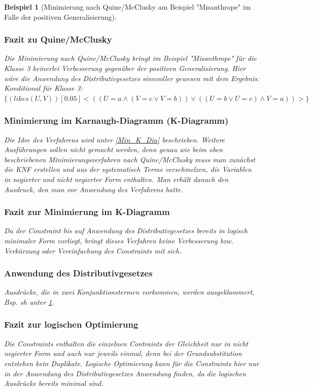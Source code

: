 \documentclass[a4paper, 11pt]{book}
\newtheorem{Bsp}{Beispiel}[section]
\begin{document}
{\begin{Bsp}[Minimierung nach Quine/McClusky am Beispiel "{}Misanthrope"{} im Falle der positiven Generalisierung]
		\subsubsection{Fazit zu Quine/McClusky}
		Die Minimierung nach Quine/McClusky bringt im Beispiel "{}Misanthrope"{} für die Klasse 3 keinerlei Verbesserung gegenüber der positiven Generalisierung. Hier wäre die Anwendung des Distributivgesetzes sinnvoller gewesen mit dem Ergebnis:\\
		Konditional für Klasse 3: $ \{(likes(U,V))[0.05] <((U = a \land (V = c \lor V = b)) \lor ((U = b \lor U = c) \land V = a))>\} $ \label{Kond3}
		\subsubsection{Minimierung im Karnaugh-Diagramm (K-Diagramm)}  \label{Min_Besch_K} 
		Die Idee des Verfahrens wird unter \ref{Min_K_Dia} beschrieben. Weitere Ausführungen sollen nicht gemacht werden, denn genau wie beim oben beschriebenen Minimierungsverfahren nach Quine/McClusky muss man zunächst die KNF erstellen und aus der systematisch Terme verschmelzen, die Variablen in negierter und nicht negierter Form enthalten. Man erhält danach den Ausdruck, den man vor Anwendung des Verfahrens hatte.
		\subsubsection{Fazit zur Minimierung im K-Diagramm}
		Da der Constraint bis auf Anwendung des Distributivgesetzes bereits in logisch minimaler Form vorliegt, bringt dieses Verfahren keine Verbesserung bzw. Verkürzung oder Vereinfachung des Constraints mit sich.
		\subsubsection{Anwendung des Distributivgesetzes}
		Ausdrücke, die in zwei Konjunktionstermen vorkommen, werden ausgeklammert, Bsp. sh unter \ref{Kond3}.
		\subsubsection{Fazit zur logischen Optimierung}
		 Die Constraints enthalten die einzelnen Contraints der Gleichheit nur in nicht negierter Form und auch nur jeweils einmal, denn bei der Grundsubstitution entstehen kein Duplikate. 
		 Logische Optimierung kann für die Constraints hier nur in der Anwendung des Distributivgesetzes Anwendung finden, da die logischen Ausdrücke bereits minimal sind.		 
\end{Bsp}
}
\end{document}
